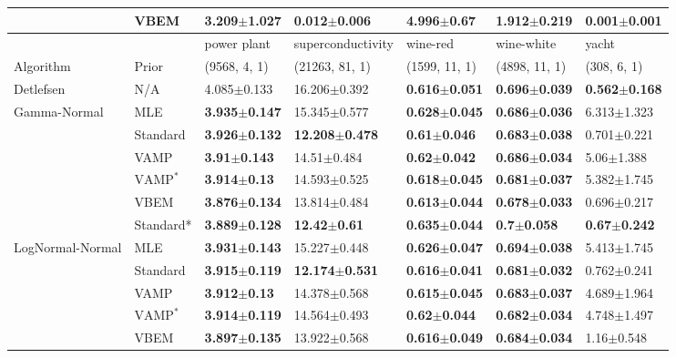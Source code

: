\begin{tabular}{lllllll}
                 & VBEM &  \textbf{3.209$\pm$1.027} &  \textbf{0.012$\pm$0.006} &            4.996$\pm$0.67 &           1.912$\pm$0.219 &           0.001$\pm$0.001 \\
\midrule
                 &      &               power plant &          superconductivity &                  wine-red &                wine-white &                     yacht \\
Algorithm & Prior& (9568, 4, 1)& (21263, 81, 1)& (1599, 11, 1)& (4898, 11, 1)& (308, 6, 1)\\
\midrule
Detlefsen & N/A &           4.085$\pm$0.133 &           16.206$\pm$0.392 &  \textbf{0.616$\pm$0.051} &  \textbf{0.696$\pm$0.039} &  \textbf{0.562$\pm$0.168} \\
Gamma-Normal & MLE &  \textbf{3.935$\pm$0.147} &           15.345$\pm$0.577 &  \textbf{0.628$\pm$0.045} &  \textbf{0.686$\pm$0.036} &           6.313$\pm$1.323 \\
                 & Standard &  \textbf{3.926$\pm$0.132} &  \textbf{12.208$\pm$0.478} &   \textbf{0.61$\pm$0.046} &  \textbf{0.683$\pm$0.038} &           0.701$\pm$0.221 \\
                 & VAMP &   \textbf{3.91$\pm$0.143} &            14.51$\pm$0.484 &   \textbf{0.62$\pm$0.042} &  \textbf{0.686$\pm$0.034} &            5.06$\pm$1.388 \\
                 & $\text{VAMP}^*$ &   \textbf{3.914$\pm$0.13} &           14.593$\pm$0.525 &  \textbf{0.618$\pm$0.045} &  \textbf{0.681$\pm$0.037} &           5.382$\pm$1.745 \\
                 & VBEM &  \textbf{3.876$\pm$0.134} &           13.814$\pm$0.484 &  \textbf{0.613$\pm$0.044} &  \textbf{0.678$\pm$0.033} &           0.696$\pm$0.217 \\
                 & Standard* &  \textbf{3.889$\pm$0.128} &    \textbf{12.42$\pm$0.61} &  \textbf{0.635$\pm$0.044} &    \textbf{0.7$\pm$0.058} &   \textbf{0.67$\pm$0.242} \\
LogNormal-Normal & MLE &  \textbf{3.931$\pm$0.143} &           15.227$\pm$0.448 &  \textbf{0.626$\pm$0.047} &  \textbf{0.694$\pm$0.038} &           5.413$\pm$1.745 \\
                 & Standard &  \textbf{3.915$\pm$0.119} &  \textbf{12.174$\pm$0.531} &  \textbf{0.616$\pm$0.041} &  \textbf{0.681$\pm$0.032} &           0.762$\pm$0.241 \\
                 & VAMP &   \textbf{3.912$\pm$0.13} &           14.378$\pm$0.568 &  \textbf{0.615$\pm$0.045} &  \textbf{0.683$\pm$0.037} &           4.689$\pm$1.964 \\
                 & $\text{VAMP}^*$ &  \textbf{3.914$\pm$0.119} &           14.564$\pm$0.493 &   \textbf{0.62$\pm$0.044} &  \textbf{0.682$\pm$0.034} &           4.748$\pm$1.497 \\
                 & VBEM &  \textbf{3.897$\pm$0.135} &           13.922$\pm$0.568 &  \textbf{0.616$\pm$0.049} &  \textbf{0.684$\pm$0.034} &            1.16$\pm$0.548 \\
\bottomrule
\end{tabular}

